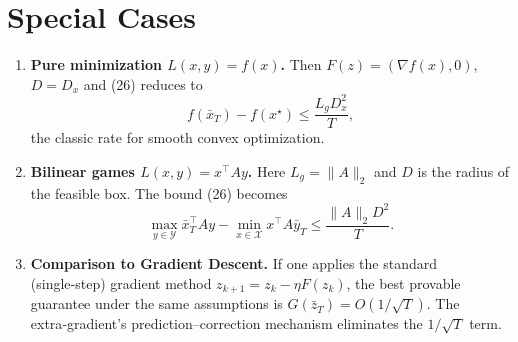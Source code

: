 \documentclass{article}
\begin{document}
\section*{Special Cases}
\begin{enumerate}[label=\alph*)]
\item \textbf{Pure minimization $L(x,y)=f(x)$.}  
Then $F(z)=(\nabla f(x),0)$, $D=D_{x}$ and (26) reduces to
\[
f(\bar x_{T})-f(x^{\star})\le \frac{L_{g}D_{x}^{2}}{T},
\]
the classic rate for smooth convex optimization.
\item \textbf{Bilinear games $L(x,y)=x^{\top}Ay$.}  
Here $L_{g}=\|A\|_{2}$ and $D$ is the radius of the feasible box. The bound (26) becomes
\[
\max_{y\in\mathcal{Y}} \bar x_{T}^{\top}Ay-\min_{x\in\mathcal{X}} x^{\top}A\bar y_{T}
\le \frac{\|A\|_{2}D^{2}}{T}.
\]
\item \textbf{Comparison to Gradient Descent.}  
If one applies the standard (single‑step) gradient method $z_{k+1}=z_{k}-\eta F(z_{k})$, the best provable guarantee under the same assumptions is $G(\bar z_{T})=O(1/\sqrt{T})$. The extra‑gradient’s prediction–correction mechanism eliminates the $1/\sqrt{T}$ term.
\end{enumerate}
\end{document}
